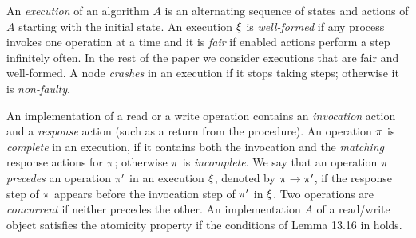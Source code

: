 %

An \textit{execution} of an algorithm $A$  is an alternating sequence of states
and actions of $A$ starting with the initial state. 
An execution $\EX$ is \textit{well-formed} if any process invokes one operation
at a time and it is \textit{fair} if enabled actions perform a step infinitely often. In the rest of the paper 
we consider executions that are fair and well-formed. A node \textit{crashes} in an execution if it stops taking steps; otherwise it is  \textit{non-faulty}.


An implementation of a read or a write operation contains an \textit{invocation} action  and a \textit{response} action (such as a
	return from the procedure). An operation $\pi$ is \textit{complete} in an execution, if it
	contains both the invocation and the \textit{matching} response actions for $\pi$; otherwise $\pi$
	is \textit{incomplete}. 
	We say that an operation $\pi$ \textit{precedes} an operation $\pi'$ in an execution $\EX$,
	denoted by $\pi\rightarrow\pi'$, if the response step of $\pi$ appears before the invocation
	step of $\pi'$ in $\EX$. Two operations are \textit{concurrent} if neither precedes the other.
	An implementation $A$ of a read/write object satisfies the atomicity property
	if the conditions of Lemma 13.16 in  \cite{Lynch1996} holds. 
	
